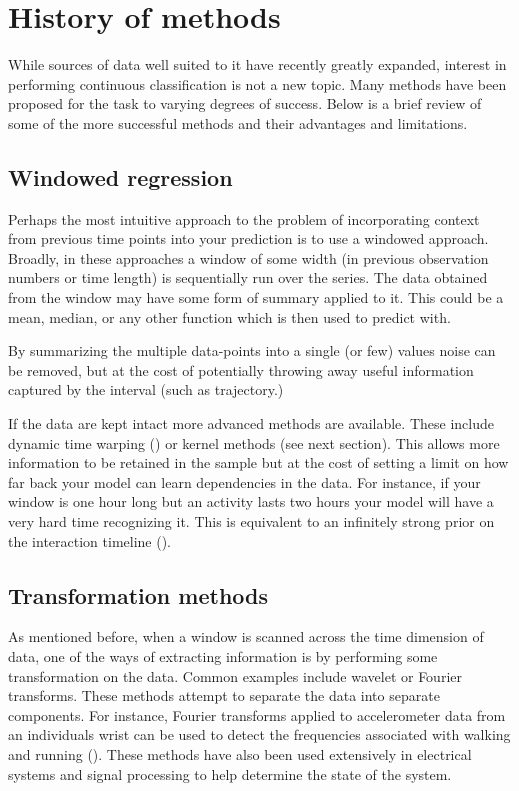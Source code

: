\documentclass[]{book}
\theoremstyle{definition}
\theoremstyle{definition}
\theoremstyle{definition}
\theoremstyle{remark}
\begin{document}
\section{History of methods}\label{history-of-methods}

While sources of data well suited to it have recently greatly expanded,
interest in performing continuous classification is not a new topic.
Many methods have been proposed for the task to varying degrees of
success. Below is a brief review of some of the more successful methods
and their advantages and limitations.

\subsection{Windowed regression}\label{windowed-regression}

Perhaps the most intuitive approach to the problem of incorporating
context from previous time points into your prediction is to use a
windowed approach. Broadly, in these approaches a window of some width
(in previous observation numbers or time length) is sequentially run
over the series. The data obtained from the window may have some form of
summary applied to it. This could be a mean, median, or any other
function which is then used to predict with.

By summarizing the multiple data-points into a single (or few) values
noise can be removed, but at the cost of potentially throwing away
useful information captured by the interval (such as trajectory.)

If the data are kept intact more advanced methods are available. These
include dynamic time warping (\citet{dtw}) or kernel methods (see next
section). This allows more information to be retained in the sample but
at the cost of setting a limit on how far back your model can learn
dependencies in the data. For instance, if your window is one hour long
but an activity lasts two hours your model will have a very hard time
recognizing it. This is equivalent to an infinitely strong prior on the
interaction timeline (\citet{graves_rnn}).

\subsection{Transformation methods}\label{transformation-methods}

As mentioned before, when a window is scanned across the time dimension
of data, one of the ways of extracting information is by performing some
transformation on the data. Common examples include wavelet or Fourier
transforms. These methods attempt to separate the data into separate
components. For instance, Fourier transforms applied to accelerometer
data from an individuals wrist can be used to detect the frequencies
associated with walking and running (\citet{accelerometer_activity}).
These methods have also been used extensively in electrical systems and
signal processing to help determine the state of the system.
\end{document}
